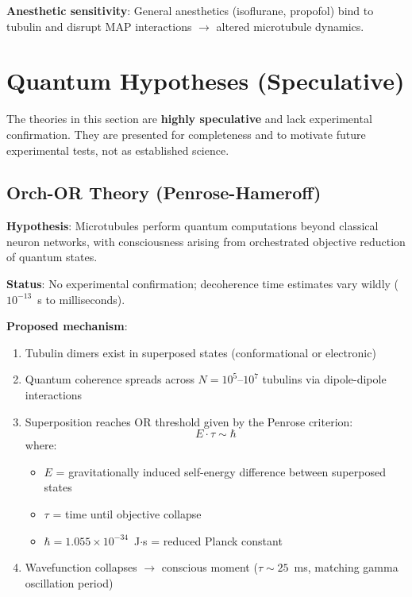 \textbf{Anesthetic sensitivity}: General anesthetics (isoflurane, propofol) bind to tubulin and disrupt MAP interactions $\rightarrow$ altered microtubule dynamics.

\section{Quantum Hypotheses (Speculative)}
\label{sec:quantum-hypotheses}

\begin{warningbox}
The theories in this section are \textbf{highly speculative} and lack experimental confirmation. They are presented for completeness and to motivate future experimental tests, not as established science.
\end{warningbox}

\subsection{Orch-OR Theory (Penrose-Hameroff)}
\label{subsec:orch-or}

\textbf{Hypothesis}: Microtubules perform quantum computations beyond classical neuron networks, with consciousness arising from orchestrated objective reduction of quantum states.

\textbf{Status}: No experimental confirmation; decoherence time estimates vary wildly ($10^{-13}$~s to milliseconds).

\textbf{Proposed mechanism}:
\begin{enumerate}
\item Tubulin dimers exist in superposed states (conformational or electronic)
\item Quantum coherence spreads across $N = 10^{5}$--$10^{7}$ tubulins via dipole-dipole interactions
\item Superposition reaches OR threshold given by the Penrose criterion:
\begin{equation}
E \cdot \tau \sim \hbar
\end{equation}
where:
\begin{itemize}
\item $E$ = gravitationally induced self-energy difference between superposed states
\item $\tau$ = time until objective collapse
\item $\hbar = 1.055 \times 10^{-34}$~J$\cdot$s = reduced Planck constant
\end{itemize}
\item Wavefunction collapses $\rightarrow$ conscious moment ($\tau \sim 25$~ms, matching gamma oscillation period)
\end{enumerate}

